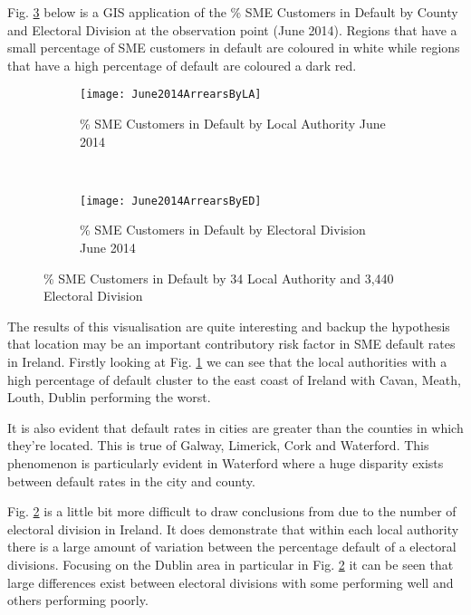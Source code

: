 Fig. \ref{fig:SMEArrearsLAED} below is a GIS application of the \% SME Customers in Default by County and Electoral Division at the observation point (June 2014). Regions that have a small percentage of SME customers in default are coloured in white while regions that have a high percentage of default are coloured a dark red.
\begin{figure}[H]
	\begin{adjustwidth}{-2cm}{-2cm}
	\begin{subfigure}[b]{0.55\textwidth}
		\captionsetup{font=scriptsize}
		\texttt{[image: June2014ArrearsByLA]}
		\caption{\% SME Customers in Default by Local Authority June 2014}\label{fig:June2014ArrearsByLA}
	\end{subfigure} ~\quad
	\begin{subfigure}[b]{0.55\textwidth}
		\captionsetup{font=scriptsize}
		\texttt{[image: June2014ArrearsByED]}
		\caption{\% SME Customers in Default by Electoral Division June 2014}
		\label{fig:June2014ArrearsByED}
	\end{subfigure}
	\caption{\% SME Customers in Default by 34 Local Authority and 3,440 Electoral Division}
	\label{fig:SMEArrearsLAED}
	\end{adjustwidth}
\end{figure}

The results of this visualisation are quite interesting and backup the hypothesis that location may be an important contributory risk factor in SME default rates in Ireland. Firstly looking at Fig. \ref{fig:June2014ArrearsByLA} we can see that the local authorities with a high percentage of default cluster to the east coast of Ireland with Cavan, Meath, Louth, Dublin performing the worst. 

It is also evident that default rates in cities are greater than the counties in which they're located. This is true of Galway, Limerick, Cork and Waterford. This phenomenon is particularly evident in Waterford where a huge disparity exists between default rates in the city and county.

Fig. \ref{fig:June2014ArrearsByED} is a little bit more difficult to draw conclusions from due to the number of electoral division in Ireland. It does demonstrate that within each local authority there is a large amount of variation between the percentage default of a electoral divisions.
Focusing on the Dublin area in particular in Fig. \ref{fig:June2014ArrearsByED} it can be seen that large differences exist between electoral divisions with some performing well and others performing poorly.
 
